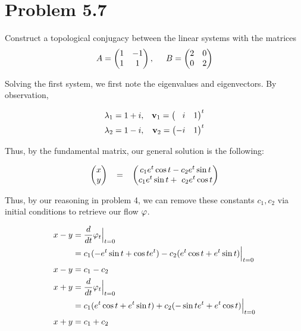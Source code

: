 \section{Problem 5.7}
Construct a topological conjugacy between the linear systems with the matrices
\[
A = \begin{pmatrix}1 &-1\\ 1&1\end{pmatrix}, \hspace{5mm} B = \begin{pmatrix}2 &0\\ 0&2\end{pmatrix}
\]
\partbreak

\begin{solution}

    Solving the first system, we first note the eigenvalues and eigenvectors. By observation,

    \begin{align}
        &\lambda_1 = 1 + i, &\textbf{v}_1 = \begin{pmatrix} \hspace{3mm} i  &1\end{pmatrix}^t\nonumber\\
        &\lambda_2 = 1 - i, &\textbf{v}_2 = \begin{pmatrix} -i &1\end{pmatrix}^t\nonumber
    \end{align}


    Thus, by the fundamental matrix, our general solution is the following: 
    
    \begin{align}
        \begin{pmatrix} x \\ y\end{pmatrix} \hspace{3mm} = \hspace{3mm} 
        \begin{pmatrix}
            c_1e^t\cos t - c_2e^t\sin t\\
            c_1e^t\sin t +\ c_2e^t\cos t
        \end{pmatrix}\label{p5.7: general soln}
    \end{align}

    Thus, by our reasoning in problem 4, we can remove these constants $c_1, c_2$ via initial conditions to retrieve our flow $\varphi$. 

    \alignbreak
    \begin{align}
        x - y &= \frac{d}{dt}\varphi_t \Big|_{t = 0}\nonumber\\
        &= c_1( - e^t\sin t + \cos t e^t) - c_2(e^t \cos t + e^t \sin t) \Big|_{t = 0}\nonumber\\
        x - y&= c_1 - c_2\nonumber\\
        x + y&= \frac{d}{dt}\varphi_t \Big|_{t = 0}\nonumber\\
        &= c_1(e^t \cos t + e^t \sin t) + c_2 (-\sin t e^t + e^t \cos t)\Big|_{t = 0}\nonumber\\
        x + y&= c_1 + c_2 \nonumber
    \end{align}
    \alignbreak



\end{solution}
